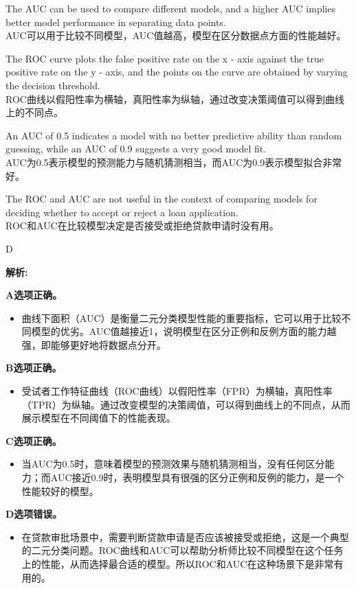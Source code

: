 \documentclass{article}
\newenvironment{explanation}
{\textbf{解析:}\par}
{\par}
\begin{document}
    \begin{choices}
        \item The AUC can be used to compare different models, and a higher AUC implies better model performance in separating data points.\\
        AUC可以用于比较不同模型，AUC值越高，模型在区分数据点方面的性能越好。
        \item The ROC curve plots the false positive rate on the x - axis against the true positive rate on the y - axis, and the points on the curve are obtained by varying the decision threshold.\\
        ROC曲线以假阳性率为横轴，真阳性率为纵轴，通过改变决策阈值可以得到曲线上的不同点。
        \item An AUC of 0.5 indicates a model with no better predictive ability than random guessing, while an AUC of 0.9 suggests a very good model fit.\\
        AUC为0.5表示模型的预测能力与随机猜测相当，而AUC为0.9表示模型拟合非常好。
        \item The ROC and AUC are not useful in the context of comparing models for deciding whether to accept or reject a loan application.\\
        ROC和AUC在比较模型决定是否接受或拒绝贷款申请时没有用。
    \end{choices}
    
    \begin{correctanswer}
        D
    \end{correctanswer}
    
    \begin{explanation}
    \textbf{A选项正确。}
    \begin{itemize}
        \item 曲线下面积（AUC）是衡量二元分类模型性能的重要指标，它可以用于比较不同模型的优劣。AUC值越接近1，说明模型在区分正例和反例方面的能力越强，即能够更好地将数据点分开。
    \end{itemize}
    \textbf{B选项正确。}
    \begin{itemize}
        \item 受试者工作特征曲线（ROC曲线）以假阳性率（FPR）为横轴，真阳性率（TPR）为纵轴。通过改变模型的决策阈值，可以得到曲线上的不同点，从而展示模型在不同阈值下的性能表现。
    \end{itemize}
    \textbf{C选项正确。}
    \begin{itemize}
        \item 当AUC为0.5时，意味着模型的预测效果与随机猜测相当，没有任何区分能力；而AUC接近0.9时，表明模型具有很强的区分正例和反例的能力，是一个性能较好的模型。
    \end{itemize}
    \textbf{D选项错误。}
    \begin{itemize}
        \item 在贷款审批场景中，需要判断贷款申请是否应该被接受或拒绝，这是一个典型的二元分类问题。ROC曲线和AUC可以帮助分析师比较不同模型在这个任务上的性能，从而选择最合适的模型。所以ROC和AUC在这种场景下是非常有用的。
    \end{itemize}
    \end{explanation}
    
\end{document}
